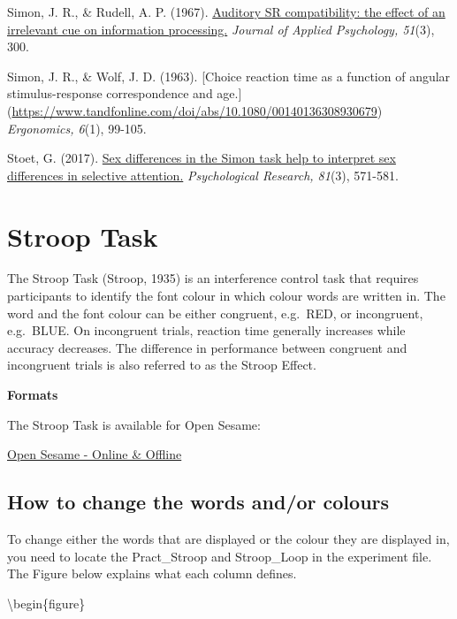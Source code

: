 \documentclass[
]{book}
\begin{document}
Simon, J. R., \& Rudell, A. P. (1967). \href{https://suprimo.lib.strath.ac.uk/permalink/f/1jihtat/TN_cdi_proquest_journals_614414775}{Auditory SR compatibility: the effect of an irrelevant cue on information processing.} \emph{Journal of Applied Psychology, 51}(3), 300.

Simon, J. R., \& Wolf, J. D. (1963). {[}Choice reaction time as a function of angular stimulus-response correspondence and age.{]} (\url{https://www.tandfonline.com/doi/abs/10.1080/00140136308930679}) \emph{Ergonomics, 6}(1), 99-105.

Stoet, G. (2017). \href{https://link.springer.com/content/pdf/10.1007/s00426-016-0763-4.pdf}{Sex differences in the Simon task help to interpret sex differences in selective attention.} \emph{Psychological Research, 81}(3), 571-581.

\hypertarget{stroop-task}{%
\section{Stroop Task}\label{stroop-task}}

The Stroop Task (Stroop, 1935) is an interference control task that requires participants to identify the font colour in which colour words are written in. The word and the font colour can be either congruent, e.g.~{RED}, or incongruent, e.g.~{BLUE}. On incongruent trials, reaction time generally increases while accuracy decreases. The difference in performance between congruent and incongruent trials is also referred to as the Stroop Effect.

\textbf{Formats}

The Stroop Task is available for Open Sesame:

\href{GitHub/StroopTask.osexp}{Open Sesame - Online \& Offline}

\hypertarget{how-to-change-the-words-andor-colours}{%
\subsection{How to change the words and/or colours}\label{how-to-change-the-words-andor-colours}}

To change either the words that are displayed or the colour they are displayed in, you need to locate the Pract\_Stroop and Stroop\_Loop in the experiment file. The Figure below explains what each column defines.

\textbackslash begin\{figure\}
\end{document}
